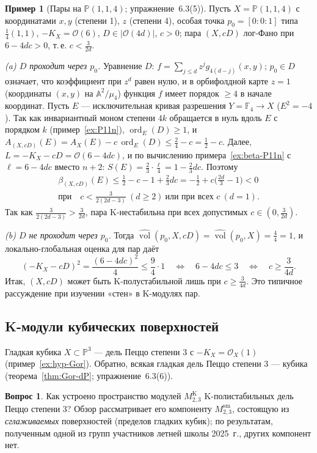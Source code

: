 \documentclass[11pt,a4paper]{article}
\theoremstyle{plain}
\theoremstyle{definition}
\newtheorem{example}[theorem]{Пример}
\newtheorem{question}[theorem]{Вопрос}
\theoremstyle{remark}
\newcommand{\PP}{\mathbb{P}}
\newcommand{\A}{\mathbb{A}}
\newcommand{\cO}{\mathcal{O}}
\DeclareMathOperator{\ord}{ord}
\DeclareMathOperator{\vol}{vol}
\newcommand{\hvol}{\widehat{\vol}}
\newcommand{\sm}{\mathrm{sm}}
\begin{document}
\begin{example}[Пары на $\PP(1,1,4)$; упражнение~6.3(5)]\label{ex:P114-pair}
Пусть $X=\PP(1,1,4)$ с координатами $x,y$ (степени 1), $z$ (степени 4), особая точка $p_0=[0:0:1]$
типа $\frac14(1,1)$, $-K_X=\cO(6)$, $D\in|\cO(4d)|$, $c>0$; пара $(X,cD)$ лог-Фано при $6-4dc>0$,
т.\,е. $c<\frac3{2d}$.

\emph{(a) $D$ проходит через $p_0$.} Уравнение $D$: $f=\sum_{j\le d}z^jg_{4(d-j)}(x,y)$;
$p_0\in D$ означает, что коэффициент при $z^d$ равен нулю, и в орбифолдной карте $z=1$
(координаты $(x,y)$ на $\A^2/\mu_4$) функция $f$ имеет порядок $\ge4$ в начале координат. Пусть
$E$ --- исключительная кривая разрешения $Y=\mathbb F_4\to X$ ($E^2=-4$). Так как инвариантный
моном степени $4k$ обращается в нуль вдоль $E$ с порядком $k$ (пример~\ref{ex:P11n}),
$\ord_E(D)\ge1$, и $A_{(X,cD)}(E)=A_X(E)-c\,\ord_E(D)\le\frac24-c=\frac12-c$. Далее, $L=-K_X-cD=\cO(6-4dc)$,
и по вычислению примера~\ref{ex:beta-P11n} с $\ell=6-4dc$ вместо $n+2$:
$S(E)=\frac23\cdot\frac{\ell}4=1-\frac23dc$. Поэтому
\begin{gather*}
\beta_{(X,cD)}(E)\le\frac12-c-1+\frac23dc=-\frac12+c\Big(\frac{2d}3-1\Big)<0\\
\text{при}\quad c<\frac{3}{2(2d-3)}\ (d\ge2)\ \text{или при всех }c\ (d=1).
\end{gather*}
Так как $\frac3{2(2d-3)}>\frac3{2d}$, пара K-нестабильна при всех допустимых $c\in(0,\frac3{2d})$.

\emph{(b) $D$ не проходит через $p_0$.} Тогда $\hvol(p_0,X,cD)=\hvol(p_0,X)=\frac44=1$, и
локально-глобальная оценка для пар даёт
\[
(-K_X-cD)^2=\frac{(6-4dc)^2}4\le\frac94\cdot1\quad\Longleftrightarrow\quad6-4dc\le3\quad\Longleftrightarrow\quad c\ge\frac3{4d}.
\]
Итак, $(X,cD)$ может быть K-полустабильной лишь при $c\ge\frac3{4d}$. Это типичное рассуждение
при изучении «стен» в K-модулях пар.
\end{example}

\subsection{K-модули кубических поверхностей}\label{ss:Kmoduli-cubic}

Гладкая кубика $X\subset\PP^3$ --- дель Пеццо степени 3 с $-K_X=\cO_X(1)$ (пример~\ref{ex:hyp-Gor}).
Обратно, всякая гладкая дель Пеццо степени 3 --- кубика (теорема~\ref{thm:Gor-dP}; упражнение~6.3(6)).

\begin{question}
Как устроено пространство модулей $M^{\mathrm K}_{2,3}$ K-полистабильных дель Пеццо степени 3?
Обзор рассматривает его компоненту $M^{\sm}_{2,3}$, состоящую из \emph{сглаживаемых} поверхностей
(пределов гладких кубик); по результатам, полученным одной из групп участников летней школы 2025~г., других компонент нет.
\end{question}
\end{document}
